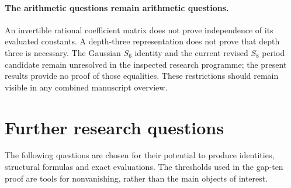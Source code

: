 \documentclass[11pt,a4paper]{article}
\theoremstyle{definition}
\theoremstyle{remark}
\numberwithin{equation}{section}
\begin{document}
\paragraph{The arithmetic questions remain arithmetic questions.}
An invertible rational coefficient matrix does not prove independence
of its evaluated constants. A depth-three representation does not
prove that depth three is necessary. The Gaussian $S_6$ identity and
the current revised $S_8$ period candidate remain unresolved in the
inspected research programme; the present results provide no proof of
those equalities. These restrictions should remain visible in any
combined manuscript overview.

\section{Further research questions}
\label{questions:section}

The following questions are chosen for their potential to produce
identities, structural formulas and exact evaluations. The thresholds
used in the gap-ten proof are tools for nonvanishing, rather than
the main objects of interest.
\end{document}
